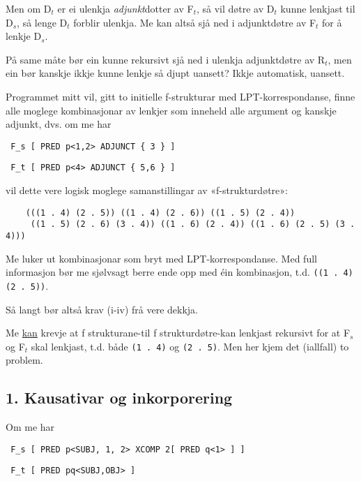 \documentclass[11pt,a4paper,oneside,draft]{book}
\begin{document}
Men om D$_t$ er ei ulenkja \emph{adjunkt}dotter av F$_t$, så vil døtre av
D$_t$ kunne lenkjast til D$_s$, så lenge D$_t$ forblir ulenkja. Me kan altså
sjå ned i adjunktdøtre av F$_t$ for å lenkje D$_s$. 

På same måte bør ein kunne rekursivt sjå ned i ulenkja adjunktdøtre av
R$_t$, men ein bør kanskje ikkje kunne lenkje så djupt uansett? Ikkje
automatisk, uansett.



Programmet mitt vil, gitt to initielle f-strukturar med
LPT-korrespondanse, finne alle moglege kombinasjonar av lenkjer som
inneheld alle argument og kanskje adjunkt, dvs. om me har

\begin{verbatim}
 F_s [ PRED p<1,2> ADJUNCT { 3 } ]
\end{verbatim}


\begin{verbatim}
 F_t [ PRED p<4> ADJUNCT { 5,6 } ]
\end{verbatim}


vil dette vere logisk moglege samanstillingar av «f-strukturdøtre»:

\begin{verbatim}
    (((1 . 4) (2 . 5)) ((1 . 4) (2 . 6)) ((1 . 5) (2 . 4))
     ((1 . 5) (2 . 6) (3 . 4)) ((1 . 6) (2 . 4)) ((1 . 6) (2 . 5) (3 . 4)))
\end{verbatim}


Me luker ut kombinasjonar som bryt med LPT-korrespondanse. Med full
informasjon bør me sjølvsagt berre ende opp med éin kombinasjon,
t.d. \texttt{((1 . 4) (2 . 5))}.

Så langt bør altså krav (i-iv) frå \citet{dyvik2009lmp} vere dekkja.

Me \underline{kan} krevje at f strukturane-til f strukturdøtre-kan lenkjast
rekursivt for at F$_s$ og F$_t$ skal lenkjast, t.d. både \texttt{(1 . 4)} og \texttt{(2 . 5)}. Men her kjem det (iallfall) to problem.


\subsection{1. Kausativar og inkorporering}
\label{sec-3.16.1}

Om me har 

\begin{verbatim}
 F_s [ PRED p<SUBJ, 1, 2> XCOMP 2[ PRED q<1> ] ]
\end{verbatim}


\begin{verbatim}
 F_t [ PRED pq<SUBJ,OBJ> ]
\end{verbatim}
\end{document}
